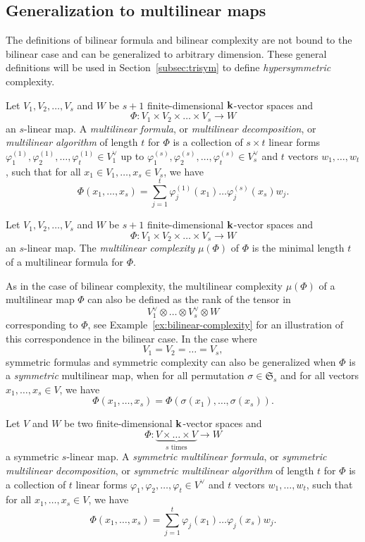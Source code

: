 \subsection{Generalization to multilinear maps}
The definitions of bilinear formula and bilinear complexity are not bound to the
bilinear case and can be generalized to arbitrary dimension. These general
definitions will be used in Section~\ref{subsec:trisym} to define
\emph{hypersymmetric} complexity.
\begin{defi}
Let $V_1, V_2, \dots, V_s$ and $W$ be $s+1$ finite-dimensional $\mathbf{k}$-vector
spaces and
\[
  \Phi:V_1\times V_2\times\dots\times V_s\to W
\]
an $s$-linear map. A \emph{multilinear formula}, or \emph{multilinear
decomposition}, or \emph{multilinear algorithm} of length $t$ for $\Phi$ is a
collection of $s\times t$ linear forms $\varphi_1^{(1)}, \varphi_2^{(1)}, \dots,
\varphi_t^{(1)}\in V_1^\vee$ up to $\varphi_1^{(s)}, \varphi_2^{(s)}, \dots,
\varphi_t^{(s)}\in V_s^{\vee}$ and $t$ vectors $w_1, \dots, w_t$, such that for all $x_1\in V_1, \dots, x_s\in
V_s$, we have
\[
  \Phi(x_1, \dots, x_s) =
  \sum_{j=1}^t\varphi_j^{(1)}(x_1)\dots\varphi_j^{(s)}(x_s)w_j.
\]
\end{defi}
\begin{defi}
Let $V_1, V_2, \dots, V_s$ and $W$ be $s+1$ finite-dimensional $\mathbf{k}$-vector
spaces and
\[
  \Phi:V_1\times V_2\times\dots\times V_s\to W
\]
an $s$-linear map. The \emph{multilinear complexity} $\mu(\Phi)$ of $\Phi$ is the
minimal length $t$ of a multilinear formula for $\Phi$.
\end{defi}
As in the case of bilinear complexity, the multilinear complexity $\mu(\Phi)$ of a
multilinear map $\Phi$ can also be defined as the rank of the tensor in 
\[
  V_1^\vee\otimes\dots\otimes V_s^\vee\otimes W
\]
corresponding to $\Phi$, see Example~\ref{ex:bilinear-complexity} for an
illustration of this correspondence in the bilinear case. In the case where
\[
  V_1 = V_2 = \dots = V_s,
\]
symmetric formulas and
symmetric complexity can also be generalized when $\Phi$ is a \emph{symmetric}
multilinear map, \ie when for all permutation $\sigma\in\mathfrak S_s$ and for
all vectors $x_1, \dots, x_s\in V$, we have
\[
  \Phi(x_1, \dots, x_s) = \Phi(\sigma(x_1), \dots, \sigma(x_s)).
\]
\begin{defi}
Let $V$ and $W$ be two finite-dimensional $\mathbf{k}$-vector
spaces and
\[
  \Phi:\underset{\textrm{$s$ times}}{\underbrace{V\times\dots\times V}}\to W
\]
a symmetric $s$-linear map. A \emph{symmetric multilinear formula}, or
\emph{symmetric multilinear
decomposition}, or \emph{symmetric multilinear algorithm} of length $t$ for $\Phi$ is a
collection of $t$ linear forms $\varphi_1, \varphi_2, \dots,
\varphi_t\in V^\vee$ and $t$ vectors $w_1, \dots, w_t$, such that for all $x_1, \dots, x_s\in
V$, we have
\[
  \Phi(x_1, \dots, x_s) =
  \sum_{j=1}^t\varphi_j(x_1)\dots\varphi_j(x_s)w_j.
\]
\end{defi}
